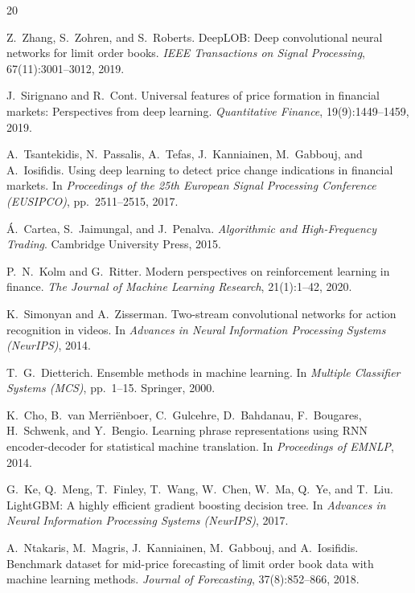 \documentclass[11pt,a4paper]{article}
\begin{document}
\begin{thebibliography}{20}

Z.~Zhang, S.~Zohren, and S.~Roberts.
\newblock DeepLOB: Deep convolutional neural networks for limit order books.
\newblock \emph{IEEE Transactions on Signal Processing}, 67(11):3001--3012, 2019.

J.~Sirignano and R.~Cont.
\newblock Universal features of price formation in financial markets: Perspectives from deep learning.
\newblock \emph{Quantitative Finance}, 19(9):1449--1459, 2019.

A.~Tsantekidis, N.~Passalis, A.~Tefas, J.~Kanniainen, M.~Gabbouj, and A.~Iosifidis.
\newblock Using deep learning to detect price change indications in financial markets.
\newblock In \emph{Proceedings of the 25th European Signal Processing Conference (EUSIPCO)}, pp.~2511--2515, 2017.

{\'A}.~Cartea, S.~Jaimungal, and J.~Penalva.
\newblock \emph{Algorithmic and High-Frequency Trading}.
\newblock Cambridge University Press, 2015.

P.~N.~Kolm and G.~Ritter.
\newblock Modern perspectives on reinforcement learning in finance.
\newblock \emph{The Journal of Machine Learning Research}, 21(1):1--42, 2020.

K.~Simonyan and A.~Zisserman.
\newblock Two-stream convolutional networks for action recognition in videos.
\newblock In \emph{Advances in Neural Information Processing Systems (NeurIPS)}, 2014.

T.~G.~Dietterich.
\newblock Ensemble methods in machine learning.
\newblock In \emph{Multiple Classifier Systems (MCS)}, pp.~1--15. Springer, 2000.

K.~Cho, B.~van Merri{\"e}nboer, C.~Gulcehre, D.~Bahdanau, F.~Bougares, H.~Schwenk, and Y.~Bengio.
\newblock Learning phrase representations using RNN encoder-decoder for statistical machine translation.
\newblock In \emph{Proceedings of EMNLP}, 2014.

G.~Ke, Q.~Meng, T.~Finley, T.~Wang, W.~Chen, W.~Ma, Q.~Ye, and T.~Liu.
\newblock LightGBM: A highly efficient gradient boosting decision tree.
\newblock In \emph{Advances in Neural Information Processing Systems (NeurIPS)}, 2017.

A.~Ntakaris, M.~Magris, J.~Kanniainen, M.~Gabbouj, and A.~Iosifidis.
\newblock Benchmark dataset for mid-price forecasting of limit order book data with machine learning methods.
\newblock \emph{Journal of Forecasting}, 37(8):852--866, 2018.


\end{thebibliography}
\end{document}
